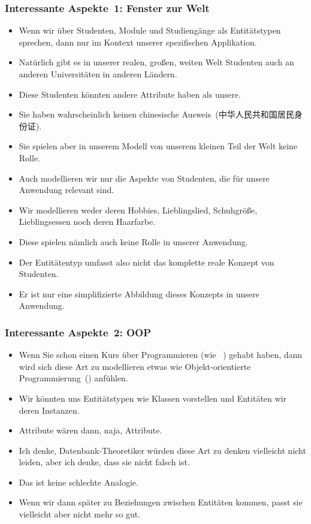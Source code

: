\documentclass[aspectratio=169,mathserif,notheorems]{beamer}%
\begin{document}
\begin{frame}%
\frametitle{Interessante Aspekte~1: Fenster zur Welt}%
\begin{itemize}%
%
%
%
%
\item<3-> Wenn wir über Studenten, Module und Studiengänge als Entitätstypen sprechen, dann nur im Kontext unserer spezifischen Applikation.%
%
\item<4-> Natürlich gibt es in unserer realen, großen, weiten Welt Studenten auch an anderen Universitäten in anderen Ländern.%
%
\item<5-> Diese Studenten könnten andere Attribute haben als unsere.%
%
\item<6-> Sie haben wahrscheinlich keinen chinesische Ausweis~(中华人民共和国居民身份证).%
%
\item<7-> Sie spielen aber in unserem Modell von unserem kleinen Teil der Welt keine Rolle.%
%
\item<8-> Auch modellieren wir nur die Aspekte von Studenten, die für unsere Anwendung relevant sind.%
%
\item<9-> Wir modellieren weder deren Hobbies, Lieblingslied, Schuhgröße, Lieblingsessen noch deren Haarfarbe.%
%
\item<10-> Diese spielen nämlich auch keine Rolle in unserer Anwendung.%
%
\item<11-> Der Entitätentyp  umfasst also nicht das komplette reale Konzept von Studenten.%
%
\item<12-> Er ist nur eine simplifizierte Abbildung dieses Konzepts in unsere Anwendung.%
\end{itemize}%
\end{frame}%
%
\begin{frame}%
\frametitle{Interessante Aspekte~2: OOP}%
%
\begin{itemize}%
\item Wenn Sie schon einen Kurs über Programmieren (wie \DEzB~\cite{programmingWithPython}) gehabt haben, dann wird sich diese Art zu modellieren etwas wie Objekt-orientierte Programmierung~() anfühlen.%
%
\item<2-> Wir könnten uns Entitätstypen wie Klassen vorstellen und Entitäten wir deren Instanzen.%
%
\item<3-> Attribute wären dann, naja, Attribute.%
%
\item<4-> Ich denke, Datenbank-Theoretiker würden diese Art zu denken vielleicht nicht leiden, aber ich denke, dass sie nicht falsch ist.%
%
\item<5-> Das ist keine schlechte Analogie.%
%
\item<6-> Wenn wir dann später zu Beziehungen zwischen Entitäten kommen, passt sie vielleicht aber nicht mehr so gut.%
%
\end{itemize}%
\end{frame}%
%
\end{document}
